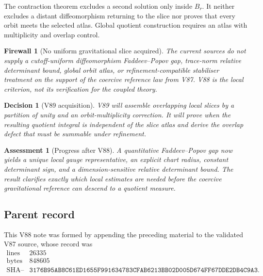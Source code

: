 \documentclass[11pt]{article}
\newtheorem{assessment}[theorem]{Assessment}
\newtheorem{firewall}[theorem]{Firewall}
\newtheorem{decision}[theorem]{Decision}
\begin{document}
\begin{warning}
\label{warn:v11v88-gribov}
The contraction theorem excludes a second solution only inside
\(B_r\).  It neither excludes a distant diffeomorphism returning to
the slice nor proves that every orbit meets the selected atlas.
Global quotient construction requires an atlas with multiplicity and
overlap control.
\end{warning}

\begin{firewall}[No uniform gravitational slice acquired]
\label{fire:v11v88-boundary}
The current sources do not supply a cutoff-uniform diffeomorphism
Faddeev--Popov gap, trace-norm relative determinant bound, global
orbit atlas, or refinement-compatible stabiliser treatment on the
support of the coercive reference law from V87.  V88 is the local
criterion, not its verification for the coupled theory.
\end{firewall}

\begin{decision}[V89 acquisition]
\label{dec:v11v88-next}
V89 will assemble overlapping local slices by a partition of unity
and an orbit-multiplicity correction.  It will prove when the
resulting quotient integral is independent of the slice atlas and
derive the overlap defect that must be summable under refinement.
\end{decision}

\begin{assessment}[Progress after V88]
\label{ass:v11v88-status}
A quantitative Faddeev--Popov gap now yields a unique local gauge
representative, an explicit chart radius, constant determinant sign,
and a dimension-sensitive relative determinant bound.  The result
clarifies exactly which local estimates are needed before the
coercive gravitational reference can descend to a quotient measure.
\end{assessment}

\subsection{Parent record}

This V88 note was formed by appending the preceding material to the
validated V87 source, whose record was
\[
\begin{array}{c|c}
\text{lines}&26335\\
\text{bytes}&848605\\
\text{SHA--256}&
\texttt{3176B95AB8C61ED1655F991634783CFAB6213BB02D005D674FF67DDE2DB4C9A3}.
\end{array}                                                     \tag{88.19}
\]
\end{document}
